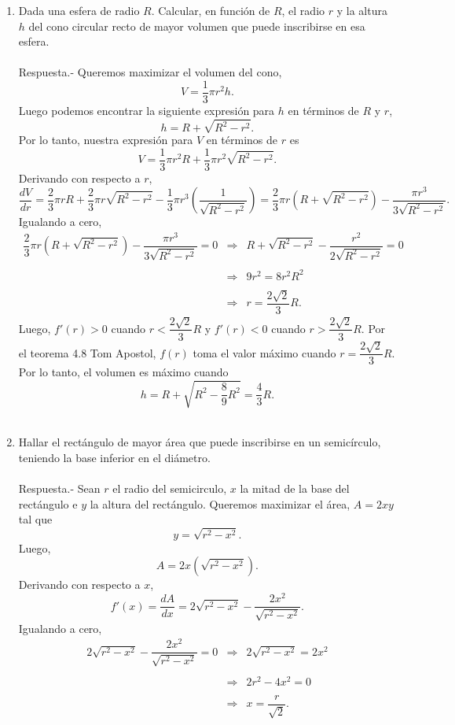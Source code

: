 \begin{enumerate}[\bfseries 1.]
    \item Dada una esfera de radio $R$. Calcular, en función de $R$, el radio $r$ y la altura $h$ del cono circular recto de mayor volumen que puede inscribirse en esa esfera.\\\\
	Respuesta.-\; Queremos maximizar el volumen del cono,
	$$V=\dfrac{1}{3}\pi r^2 h.$$
	Luego podemos encontrar la siguiente expresión para $h$ en términos de $R$ y $r$,
	$$h=R+\sqrt{R^2-r^2}.$$
	Por lo tanto, nuestra expresión para $V$ en términos de $r$ es
	$$V=\dfrac{1}{3}\pi r^2 R + \dfrac{1}{3}\pi r^2 \sqrt{R^2-r^2}.$$
	Derivando con respecto a $r$,
	$$\dfrac{dV}{dr}=\dfrac{2}{3}\pi r R + \dfrac{2}{3}\pi r \sqrt{R^2-r^2} - \dfrac{1}{3}\pi r^3 \left(\dfrac{1}{\sqrt{R^2-r^2}}\right)=\dfrac{2}{3}\pi r \left(R+\sqrt{R^2-r^2}\right)-\dfrac{\pi r^3}{3\sqrt{R^2-r^2}}.$$
	Igualando a cero,
	$$\begin{array}{rcl}
	    \dfrac{2}{3}\pi r \left(R+\sqrt{R^2-r^2}\right)-\dfrac{\pi r^3}{3\sqrt{R^2-r^2}}=0 &\Rightarrow& R+\sqrt{R^2-r^2}-\dfrac{r^2}{2\sqrt{R^2-r^2}}=0\\\\
											       &\Rightarrow& 9r^2=8r^2R^2\\\\
											       &\Rightarrow& r=\dfrac{2\sqrt{2}}{3}R.
	\end{array}$$
	Luego, $f'(r)>0$ cuando $r<\dfrac{2\sqrt{2}}{3}R$ y $f'(r)<0$ cuando $r>\dfrac{2\sqrt{2}}{3}R$. Por el teorema 4.8 Tom Apostol, $f(r)$ toma el valor máximo cuando $r=\dfrac{2\sqrt{2}}{3}R$. Por lo tanto, el volumen es máximo cuando
	$$h=R+\sqrt{R^2-\dfrac{8}{9}R^2}=\dfrac{4}{3}R.$$\\

    \item Hallar el rectángulo de mayor área que puede inscribirse en un semicírculo, teniendo la base inferior en el diámetro.\\\\
	Respuesta.-\; Sean $r$ el radio del semicirculo, $x$ la mitad de la base del rectángulo e $y$ la altura del rectángulo. Queremos maximizar el área, $A=2xy$ tal que 
	$$y=\sqrt{r^2-x^2}.$$
	Luego,
	$$A=2x\left(\sqrt{r^2-x^2}\right).$$
	Derivando con respecto a $x$,
	$$f'(x)=\dfrac{dA}{dx}=2\sqrt{r^2-x^2}-\dfrac{2x^2}{\sqrt{r^2-x^2}}.$$
	Igualando a cero,
	$$\begin{array}{rcl}
	    2\sqrt{r^2-x^2}-\dfrac{2x^2}{\sqrt{r^2-x^2}}=0 &\Rightarrow& 2\sqrt{r^2-x^2}=2x^2\\\\
	    							      &\Rightarrow& 2r^2-4x^2=0\\\\
								      &\Rightarrow& x=\dfrac{r}{\sqrt{2}}.
	\end{array}$$


\end{enumerate}
